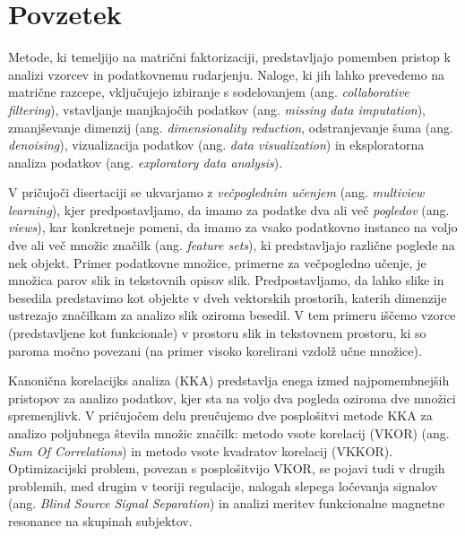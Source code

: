 %
\chapter*{Povzetek}

Metode, ki temeljijo na matrični faktorizaciji, predstavljajo pomemben pristop k analizi vzorcev
in podatkovnemu rudarjenju. Naloge, ki jih lahko prevedemo na matrične razcepe, vključujejo izbiranje
s sodelovanjem (ang. \emph{collaborative filtering}), vstavljanje manjkajočih podatkov (ang. \emph{missing data imputation}),
zmanjševanje dimenzij (ang. \emph{dimensionality reduction}, odstranjevanje šuma (ang. \emph{denoising}), vizualizacija
podatkov (ang. \emph{data visualization}) in eksploratorna analiza podatkov (ang. \emph{exploratory data analysis}).

V pričujoči disertaciji se ukvarjamo z \emph{večpoglednim učenjem} (ang. \emph{multiview learning}), kjer
predpostavljamo, da imamo za podatke dva ali več \emph{pogledov} (ang. \emph{views}), kar konkretneje
pomeni, da imamo za vsako podatkovno instanco na voljo dve ali več množic značilk (ang. \emph{feature sets}),
ki predstavljajo različne poglede na nek objekt. Primer podatkovne množice, primerne za večpogledno učenje,
je množica parov slik in tekstovnih opisov slik. Predpostavljamo, da lahko slike in besedila
predstavimo kot objekte v dveh vektorskih prostorih, katerih dimenzije ustrezajo značilkam za analizo
slik oziroma besedil. V tem primeru iščemo vzorce (predstavljene kot funkcionale) v prostoru slik
in tekstovnem prostoru, ki so paroma močno povezani (na primer visoko korelirani vzdolž učne množice).

Kanonična korelacijks analiza (KKA) predstavlja enega izmed najpomembnejših pristopov za analizo
podatkov, kjer sta na voljo dva pogleda oziroma dve množici spremenjlivk. V pričujočem delu
preučujemo dve posplošitvi metode KKA za analizo poljubnega števila množic značilk: metodo
vsote korelacij (VKOR) (ang. \emph{Sum Of Correlations}) in metodo vsote kvadratov korelacij (VKKOR).
Optimizacijski problem, povezan s posplošitvijo VKOR, se pojavi tudi v drugih problemih, med drugim
v teoriji regulacije, nalogah slepega ločevanja signalov (ang. \emph{Blind Source Signal Separation})
in analizi meritev funkcionalne magnetne resonance na skupinah subjektov.

